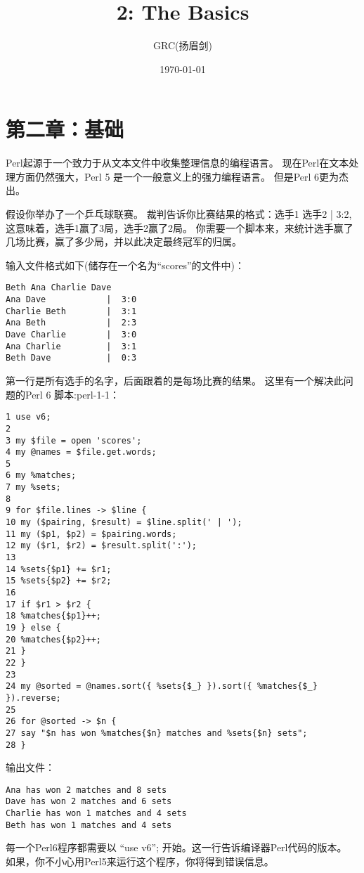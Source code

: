\documentclass[11pt]{article}
\title{2: The Basics}
\author{GRC(扬眉剑)}
\date{\today}
\begin{document}
\maketitle

\setcounter{tocdepth}{3}
\tableofcontents
\vspace*{1cm}
\section{第二章：基础}
\label{sec-1}

Perl起源于一个致力于从文本文件中收集整理信息的编程语言。
现在Perl在文本处理方面仍然强大，Perl 5 是一个一般意义上的强力编程语言。
但是Perl 6更为杰出。

假设你举办了一个乒乓球联赛。
裁判告诉你比赛结果的格式：选手1 选手2 | 3:2,这意味着，选手1赢了3局，选手2赢了2局。
你需要一个脚本来，来统计选手赢了几场比赛，赢了多少局，并以此决定最终冠军的归属。

输入文件格式如下(储存在一个名为“scores”的文件中)：\\

\begin{verbatim}
Beth Ana Charlie Dave 
Ana Dave            |  3:0
Charlie Beth        |  3:1
Ana Beth            |  2:3
Dave Charlie        |  3:0
Ana Charlie         |  3:1
Beth Dave           |  0:3
\end{verbatim}

第一行是所有选手的名字，后面跟着的是每场比赛的结果。
这里有一个解决此问题的Perl 6 脚本:perl-1-1：

\begin{verbatim}
1 use v6;
2
3 my $file = open 'scores';
4 my @names = $file.get.words;
5
6 my %matches;
7 my %sets;
8
9 for $file.lines -> $line {
10 my ($pairing, $result) = $line.split(' | ');
11 my ($p1, $p2) = $pairing.words;
12 my ($r1, $r2) = $result.split(':');
13
14 %sets{$p1} += $r1;
15 %sets{$p2} += $r2;
16
17 if $r1 > $r2 {
18 %matches{$p1}++;
19 } else {
20 %matches{$p2}++;
21 }
22 }
23
24 my @sorted = @names.sort({ %sets{$_} }).sort({ %matches{$_} }).reverse;
25
26 for @sorted -> $n {
27 say "$n has won %matches{$n} matches and %sets{$n} sets";
28 }
\end{verbatim}
输出文件：

\begin{verbatim}
Ana has won 2 matches and 8 sets
Dave has won 2 matches and 6 sets
Charlie has won 1 matches and 4 sets
Beth has won 1 matches and 4 sets
\end{verbatim}
每一个Perl6程序都需要以 “use v6”; 开始。这一行告诉编译器Perl代码的版本。
如果，你不小心用Perl5来运行这个程序，你将得到错误信息。
\end{document}
